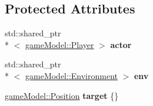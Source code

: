 \subsection*{Protected Attributes}
\begin{DoxyCompactItemize}
\item 
\hypertarget{classgame_controller_1_1_action_a3941f4d176b7631affa1710990a0cb0f}{std\-::shared\-\_\-ptr\\*
$<$ \hyperlink{classgame_model_1_1_player}{game\-Model\-::\-Player} $>$ {\bfseries actor}}\label{classgame_controller_1_1_action_a3941f4d176b7631affa1710990a0cb0f}

\item 
\hypertarget{classgame_controller_1_1_action_a77683804e62e608d15e4cc311c278c48}{std\-::shared\-\_\-ptr\\*
$<$ \hyperlink{classgame_model_1_1_environment}{game\-Model\-::\-Environment} $>$ {\bfseries env}}\label{classgame_controller_1_1_action_a77683804e62e608d15e4cc311c278c48}

\item 
\hypertarget{classgame_controller_1_1_action_a84d08ebf577d3ef17ae996c4394d61b6}{\hyperlink{structgame_model_1_1_position}{game\-Model\-::\-Position} {\bfseries target} \{\}}\label{classgame_controller_1_1_action_a84d08ebf577d3ef17ae996c4394d61b6}

\end{DoxyCompactItemize}


